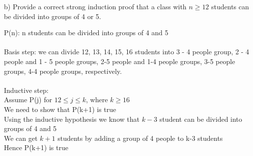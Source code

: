 \documentclass[a4paper]{exam}
\begin{document}
\begin{questions}
\begin{solution}
      
  \end{solution}
b)
Provide a correct strong induction proof that a class with \( n \geq 12 \) students can be divided into groups of 4 or 5.
  \begin{solution}
    P(n): n students can be divided into groups of 4 and 5\\\\
    Basis step: we can divide 12, 13, 14, 15, 16 students into 3 - 4 people group, 2 - 4 people and 1 - 5 people groups,     
    2-5 people and 1-4 people groups, 3-5 people groups, 4-4 people groups, respectively.\\\\
    Inductive step:\\
    Assume P(j) for $12 \leq j \leq k$, where $k \geq 16$\\
    We need to show that P(k+1) is true\\
    Using the inductive hypothesis we know that $k-3$ student can be divided into groups of 4 and 5\\
    We can get $k+1$ students by adding a group of 4 people to k-3 students\\
    Hence P(k+1) is true
  \end{solution}

\end{questions}
\end{document}
